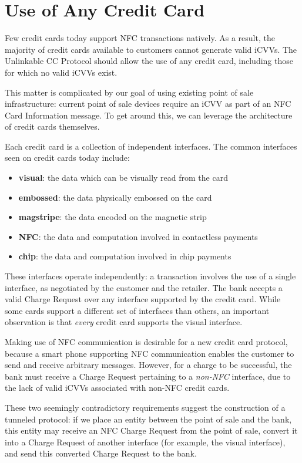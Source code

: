 \section{Use of Any Credit Card}
\label{sec:goals-anycard}

Few credit cards today support NFC transactions natively.
As a result, the majority of credit cards available to customers cannot generate valid iCVVs.
The Unlinkable CC Protocol should allow the use of any credit card, including those for which no valid iCVVs exist.

This matter is complicated by our goal of using existing point of sale infrastructure:
    current point of sale devices require an iCVV as part of an NFC Card Information message.
To get around this, we can leverage the architecture of credit cards themselves.

Each credit card is a collection of independent interfaces.
The common interfaces seen on credit cards today include:

\begin{itemize}
\item \textbf{visual}: the data which can be visually read from the card
\item \textbf{embossed}: the data physically embossed on the card
\item \textbf{magstripe}: the data encoded on the magnetic strip
\item \textbf{NFC}: the data and computation involved in contactless payments
\item \textbf{chip}: the data and computation involved in chip payments
\end{itemize}

These interfaces operate independently:
    a transaction involves the use of a single interface, as negotiated by the customer and the retailer.
The bank accepts a valid Charge Request over any interface supported by the credit card.
While some cards support a different set of interfaces than others, an important observation is that \emph{every} credit card supports the visual interface.

Making use of NFC communication is desirable for a new credit card protocol,
    because a smart phone supporting NFC communication enables the customer to send and receive arbitrary messages.
However, for a charge to be successful, the bank must receive a Charge Request pertaining to a \emph{non-NFC} interface,
    due to the lack of valid iCVVs associated with non-NFC credit cards.

These two seemingly contradictory requirements suggest the construction of a tunneled protocol:
    if we place an entity between the point of sale and the bank, this entity may receive an NFC Charge Request from the point of sale,
    convert it into a Charge Request of another interface (for example, the visual interface),
    and send this converted Charge Request to the bank.
